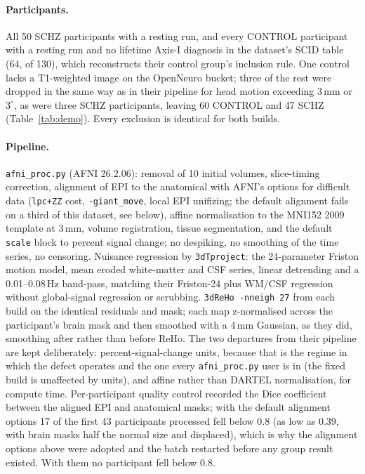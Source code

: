 \documentclass[11pt]{article}
\newcommand{\code}[1]{\texttt{#1}}
\begin{document}
\paragraph{Participants.} All 50 SCHZ participants with a resting run, and every CONTROL participant with a resting run and no lifetime Axis-I diagnosis in the dataset's SCID table (64, of 130), which reconstructs their control group's inclusion rule. One control lacks a T1-weighted image on the OpenNeuro bucket; three of the rest were dropped in the same way as in their pipeline for head motion exceeding 3\,mm or $3^\circ$, as were three SCHZ participants, leaving 60 CONTROL and 47 SCHZ (Table~\ref{tab:demo}). Every exclusion is identical for both builds.

\paragraph{Pipeline.} \code{afni\_proc.py} (AFNI 26.2.06): removal of 10 initial volumes, slice-timing correction, alignment of EPI to the anatomical with AFNI's options for difficult data (\code{lpc+ZZ} cost, \code{-giant\_move}, local EPI unifizing; the default alignment fails on a third of this dataset, see below), affine normalisation to the MNI152 2009 template at 3\,mm, volume registration, tissue segmentation, and the default \code{scale} block to percent signal change; no despiking, no smoothing of the time series, no censoring. Nuisance regression by \code{3dTproject}: the 24-parameter Friston motion model, mean eroded white-matter and CSF series, linear detrending and a 0.01--0.08\,Hz band-pass, matching their Friston-24 plus WM/CSF regression without global-signal regression or scrubbing. \code{3dReHo -nneigh 27} from each build on the identical residuals and mask; each map z-normalised across the participant's brain mask and then smoothed with a 4\,mm Gaussian, as they did, smoothing after rather than before ReHo. The two departures from their pipeline are kept deliberately: percent-signal-change units, because that is the regime in which the defect operates and the one every \code{afni\_proc.py} user is in (the fixed build is unaffected by units), and affine rather than DARTEL normalisation, for compute time. Per-participant quality control recorded the Dice coefficient between the aligned EPI and anatomical masks; with the default alignment options 17 of the first 43 participants processed fell below 0.8 (as low as 0.39, with brain masks half the normal size and displaced), which is why the alignment options above were adopted and the batch restarted before any group result existed. With them no participant fell below 0.8.
\end{document}
